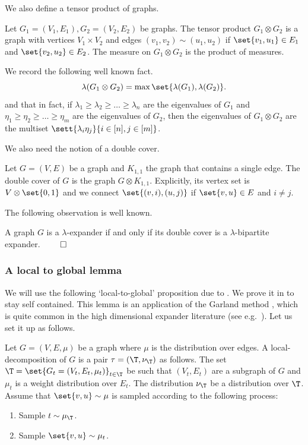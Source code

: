 We also define a tensor product of graphs.
\begin{definition}
    Let \(G_1 = (V_1,E_1),G_2 = (V_2,E_2)\) be graphs. The tensor product \(G_1 \otimes G_2\) is a graph with vertices \(V_1 \times V_2\) and edges \((v_1,v_2) \sim (u_1,u_2)\) if \(\set{v_1,u_1} \in E_1\) and \(\set{v_2,u_2} \in E_2\). The measure on \(G_1\otimes G_2\) is the product of measures.
\end{definition}
We record the following well known fact.
\begin{equation} \label{eq:tensors}
    \lambda(G_1 \otimes G_2) = \max \set{\lambda(G_1), \lambda(G_2)}.
\end{equation}
and that in fact, if \(\lambda_1 \geq \lambda_2 \geq \dots \geq \lambda_n\) are the eigenvalues of \(G_1\) and \(\eta_1 \geq \eta_2 \geq \dots \geq \eta_m\) are the eigenvalues of \(G_2\), then the eigenvalues of \(G_1 \otimes G_2\) are the multiset \(\sett{\lambda_i \eta_j}{i \in [n], j \in [m]}\).

We also need the notion of a double cover.
\begin{definition} \label{def:double-cover}
    Let \(G = (V,E)\) be a graph and \(K_{1,1}\) the graph that contains a single edge. The double cover of \(G\) is the graph \(G \otimes K_{1,1}\). Explicitly, its vertex set is \(V \otimes \set{0,1}\) and we connect \(\set{(v,i),(u,j)}\) if \(\set{v,u} \in E\) and \(i \ne j\).
\end{definition}
The following observation is well known.
\begin{observation} \label{obs:double-cover-expansion}
    A graph \(G\) is a \(\lambda\)-expander if and only if its double cover is a \(\lambda\)-bipartite expander. \(\qed\)
\end{observation}

\subsubsection{A local to global lemma} \label{sec:local-to-global}
We will use the following `local-to-global' proposition due to \cite[Theorem 1.1]{Madras2002}. We prove it in  to stay self contained. This lemma is an application of the Garland method \cite{Garland1973}, which is quite common in the high dimensional expander literature (see e.g.\ \cite{oppenheim2018local}). Let us set it up as follows.

Let \(G = (V,E,\mu)\) be a graph where \(\mu\) is the distribution over edges. A local-decomposition of \(G\) is a pair \(\tau = (\T,\nu_{\T})\) as follows. The set \(\T = \set{G_t=(V_t,E_t,\mu_t)}_{t \in \T}\) be such that \((V_t,E_t)\) are a subgraph of \(G\) and \(\mu_t\) is a weight distribution over \(E_t\). The distribution \(\nu_\T\) be a distribution over \(\T\). Assume that \(\set{v,u} \sim \mu\) is sampled according to the following process:
\begin{enumerate}
    \item Sample \(t \sim \mu_\T\).
    \item Sample \(\set{v,u} \sim \mu_t\).
\end{enumerate}

